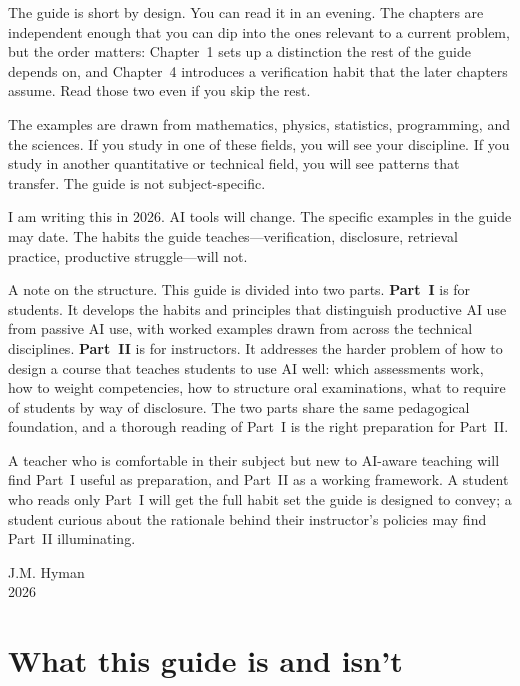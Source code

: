 \documentclass[11pt]{book}
\begin{document}
The guide is short by design. You can read it in an evening. The chapters are independent enough that you can dip into the ones relevant to a current problem, but the order matters: Chapter~1 sets up a distinction the rest of the guide depends on, and Chapter~4 introduces a verification habit that the later chapters assume. Read those two even if you skip the rest.

The examples are drawn from mathematics, physics, statistics, programming, and the sciences. If you study in one of these fields, you will see your discipline. If you study in another quantitative or technical field, you will see patterns that transfer. The guide is not subject-specific.

I am writing this in 2026. AI tools will change. The specific examples in the guide may date. The habits the guide teaches---verification, disclosure, retrieval practice, productive struggle---will not.

A note on the structure. This guide is divided into two parts. \textbf{Part~I} is for students. It develops the habits and principles that distinguish productive AI use from passive AI use, with worked examples drawn from across the technical disciplines. \textbf{Part~II} is for instructors. It addresses the harder problem of how to design a course that teaches students to use AI well: which assessments work, how to weight competencies, how to structure oral examinations, what to require of students by way of disclosure. The two parts share the same pedagogical foundation, and a thorough reading of Part~I is the right preparation for Part~II.

A teacher who is comfortable in their subject but new to AI-aware teaching will find Part~I useful as preparation, and Part~II as a working framework. A student who reads only Part~I will get the full habit set the guide is designed to convey; a student curious about the rationale behind their instructor's policies may find Part~II illuminating.

\hfill J.M. Hyman\\
\hfill 2026

\chapter*{What this guide is and isn't}
\end{document}
